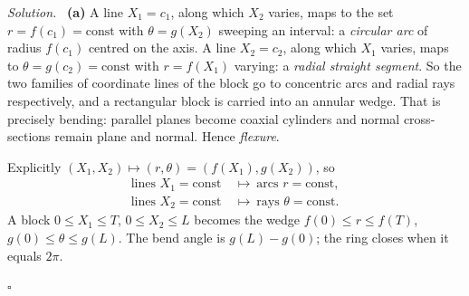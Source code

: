 \documentclass[17pt,a4paper]{extreport}
\theoremstyle{scplain}
\theoremstyle{scdefn}
\newenvironment{solution}{\par\smallskip\noindent\textit{Solution.}\ }
  {\hfill$\square$\par\smallskip}
\begin{document}
\begin{solution}
\textbf{(a)} A line $X_{1}=c_{1}$, along which $X_{2}$ varies, maps to the
set $r=f(c_{1})=\text{const}$ with $\theta=g(X_{2})$ sweeping an interval:
a \emph{circular arc} of radius $f(c_{1})$ centred on the axis. A line
$X_{2}=c_{2}$, along which $X_{1}$ varies, maps to $\theta=g(c_{2})
=\text{const}$ with $r=f(X_{1})$ varying: a \emph{radial straight
segment}. So the two families of coordinate lines of the block go to
concentric arcs and radial rays respectively, and a rectangular block is
carried into an annular wedge. That is precisely bending: parallel planes
become coaxial cylinders and normal cross-sections remain plane and
normal. Hence \emph{flexure}.

Explicitly $(X_{1},X_{2})\mapsto(r,\theta)=(f(X_{1}),g(X_{2}))$, so
\[
\begin{aligned}
   \text{lines } X_{1}=\text{const}\ &\longmapsto\ \text{arcs }
     r=\text{const},\\
   \text{lines } X_{2}=\text{const}\ &\longmapsto\ \text{rays }
     \theta=\text{const}.
\end{aligned}
\]
A block $0\le X_{1}\le T$, $0\le X_{2}\le L$ becomes the wedge
$f(0)\le r\le f(T)$, $g(0)\le\theta\le g(L)$. The bend angle is
$g(L)-g(0)$; the ring closes when it equals $2\pi$.


\end{solution}
\end{document}
